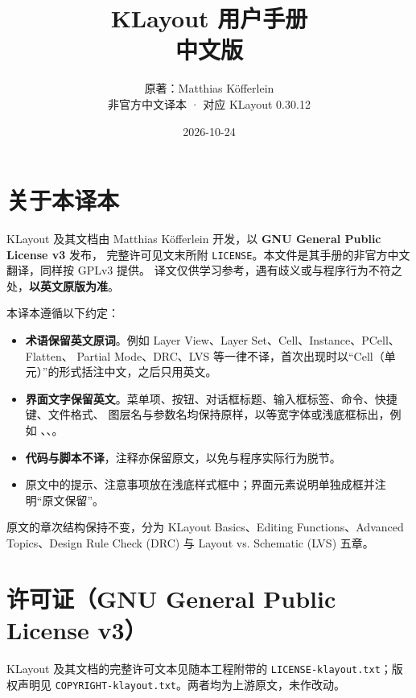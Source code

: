 \documentclass[UTF8,zihao=-4,a4paper,oneside]{ctexbook}
\title{KLayout 用户手册\\[0.4em]\large 中文版}
\author{原著：Matthias Köfferlein\\[0.3em]\small 非官方中文译本 · 对应 KLayout 0.30.12}
\date{2026-10-24}
\begin{document}
\frontmatter
\maketitle

\chapter{关于本译本}

\begin{klNote}[版权与免责]
KLayout 及其文档由 Matthias Köfferlein 开发，以 \textbf{GNU General Public License v3} 发布，
完整许可见文末所附 \texttt{LICENSE}。本文件是其手册的非官方中文翻译，同样按 GPLv3 提供。
译文仅供学习参考，遇有歧义或与程序行为不符之处，\textbf{以英文原版为准}。
\end{klNote}

本译本遵循以下约定：

\begin{itemize}[leftmargin=2em]
  \item \textbf{术语保留英文原词}。例如 Layer View、Layer Set、Cell、Instance、PCell、Flatten、
        Partial Mode、DRC、LVS 等一律不译，首次出现时以“Cell（单元）”的形式括注中文，之后只用英文。
  \item \textbf{界面文字保留英文}。菜单项、按钮、对话框标题、输入框标签、命令、快捷键、文件格式、
        图层名与参数名均保持原样，以等宽字体或浅底框标出，例如 、、。
  \item \textbf{代码与脚本不译}，注释亦保留原文，以免与程序实际行为脱节。
  \item 原文中的提示、注意事项放在浅底样式框中；界面元素说明单独成框并注明“原文保留”。
\end{itemize}

原文的章次结构保持不变，分为 KLayout Basics、Editing Functions、Advanced Topics、Design Rule Check (DRC)
与 Layout vs. Schematic (LVS) 五章。

\tableofcontents
\clearpage

\mainmatter







\appendix
\chapter{许可证（GNU General Public License v3）}

KLayout 及其文档的完整许可文本见随本工程附带的 \texttt{LICENSE-klayout.txt}；版权声明见
\texttt{COPYRIGHT-klayout.txt}。两者均为上游原文，未作改动。
\end{document}
